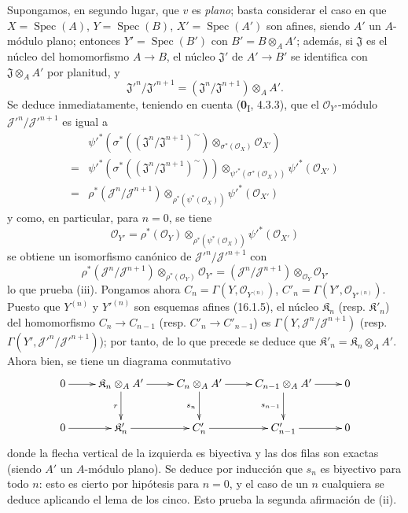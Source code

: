 Supongamos, en segundo lugar, que $v$ es \emph{plano}; basta considerar el caso en que
$X=\operatorname{Spec}(A)$, $Y=\operatorname{Spec}(B)$,
$X'=\operatorname{Spec}(A')$ son afines, siendo $A'$ un $A$-módulo plano;
entonces $Y'=\operatorname{Spec}(B')$ con $B'=B\otimes_A A'$; además, si
$\mathfrak J$ es el núcleo del homomorfismo $A\to B$, el núcleo
$\mathfrak J'$ de $A'\to B'$ se identifica con $\mathfrak J\otimes_A A'$ por
planitud, y
\[
  \mathfrak J'^n/\mathfrak J'^{n+1}
  =(\mathfrak J^n/\mathfrak J^{n+1})\otimes_A A'.
\]
Se deduce inmediatamente, teniendo en cuenta (\textbf{0}\textsubscript{I}, 4.3.3), que el
$\mathcal{O}_{Y'}$-módulo
$\mathscr J'^n/\mathscr J'^{n+1}$ es igual a
\begin{align*}
&\psi'^*\!\left(\sigma^*
  \left((\mathfrak J^n/\mathfrak J^{n+1})^{\sim}\right)
  \otimes_{\sigma^*(\mathcal O_X)}\mathcal O_{X'}\right) \\
={}&
\psi'^*\!\left(\sigma^*
  \left((\mathfrak J^n/\mathfrak J^{n+1})^{\sim}\right)\right)
  \otimes_{\psi'^*(\sigma^*(\mathcal{O}_X))}
  \psi'^*(\mathcal{O}_{X'}) \\
={}&
\rho^*(\mathscr J^n/\mathscr J^{n+1})
  \otimes_{\rho^*(\psi^*(\mathcal{O}_X))}
  \psi'^*(\mathcal{O}_{X'})
\end{align*}
y como, en particular, para $n=0$, se tiene
\[
  \mathcal{O}_{Y'}=
  \rho^*(\mathcal{O}_Y)
  \otimes_{\rho^*(\psi^*(\mathcal{O}_X))}
  \psi'^*(\mathcal{O}_{X'})
\]
se obtiene un isomorfismo canónico de
$\mathscr J'^n/\mathscr J'^{n+1}$ con
\[
  \rho^*(\mathscr J^n/\mathscr J^{n+1})
  \otimes_{\rho^*(\mathcal{O}_Y)}\mathcal{O}_{Y'}
  =
  (\mathscr J^n/\mathscr J^{n+1})
  \otimes_{\mathcal{O}_Y}\mathcal{O}_{Y'}
\]
lo que prueba (iii). Pongamos ahora
$C_n=\Gamma(Y,\mathcal{O}_{Y^{(n)}})$,
$C'_n=\Gamma(Y',\mathcal{O}_{Y'^{(n)}})$. Puesto que $Y^{(n)}$ y
$Y'^{(n)}$ son esquemas afines (16.1.5), el núcleo
$\mathfrak{K}_n$ (resp. $\mathfrak{K}'_n$) del homomorfismo
$C_n\to C_{n-1}$ (resp. $C'_n\to C'_{n-1}$) es
$\Gamma(Y,\mathscr J^n/\mathscr J^{n+1})$ (resp.
$\Gamma(Y',\mathscr J'^n/\mathscr J'^{n+1})$); por tanto, de lo que
precede se deduce que $\mathfrak{K}'_n=\mathfrak{K}_n\otimes_A A'$. Ahora bien, se tiene un
diagrama conmutativo
\[
  \xymatrix{
    0 \ar[r] &
    \mathfrak{K}_n\otimes_A A' \ar[r]\ar[d]_r &
    C_n\otimes_A A' \ar[r]\ar[d]_{s_n} &
    C_{n-1}\otimes_A A' \ar[r]\ar[d]_{s_{n-1}} & 0 \\
    0 \ar[r] &
    \mathfrak{K}'_n \ar[r] &
    C'_n \ar[r] &
    C'_{n-1} \ar[r] & 0
  }
\]
donde la flecha vertical de la izquierda es biyectiva y las dos filas son exactas
(siendo $A'$ un $A$-módulo plano). Se deduce por inducción que $s_n$ es
biyectivo para todo $n$: esto es cierto por hipótesis para $n=0$, y el caso de un
$n$ cualquiera se deduce aplicando el lema de los cinco. Esto prueba la segunda
afirmación de (ii).

